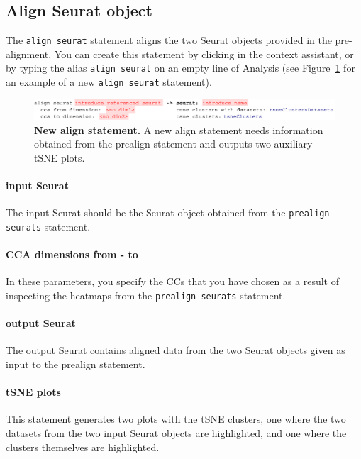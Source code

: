 \subsection{Align Seurat object}
The \texttt{align seurat} statement aligns the two Seurat objects provided in the pre-alignment.
You can create this statement by clicking
 in the context assistant, or by typing
the alias \texttt{align seurat} on an empty line of Analysis (see Figure~\ref{fig:AlignSeurat}
for an example of a new \texttt{align seurat} statement).

\begin{figure}[h!tbp]
  \centering
    \includegraphics[width=\figWidthWide]{figures/AlignSeurat.pdf}
    \caption[New align statement.]{\textbf{New align statement.} A new align statement
    needs information obtained from the prealign statement and outputs two auxiliary
    tSNE plots.}
\label{fig:AlignSeurat}
\end{figure}

\paragraph{input Seurat} The input Seurat should be the Seurat object obtained from the
\texttt{prealign seurats} statement.

\paragraph{CCA dimensions from - to} In these parameters, you specify the CCs that you have
chosen as a result of inspecting the heatmaps from the \texttt{prealign seurats} statement.

\paragraph{output Seurat} The output Seurat contains aligned data from the two Seurat objects
given as input to the prealign statement.

\paragraph{tSNE plots} This statement generates two plots with the tSNE clusters, one where
the two datasets from the two input Seurat objects are highlighted, and one where the clusters
themselves are highlighted.

